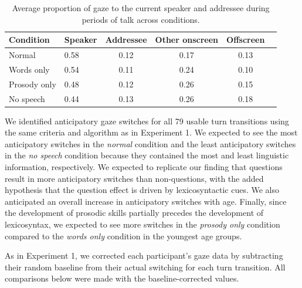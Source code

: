 \documentclass[authoryear, 12pt]{elsarticle}
\begin{document}
\begin{table}[t]
\begin{center}
  \begin{tabular}{llcccc}
    \hline
    Condition & Speaker & Addressee & Other onscreen & Offscreen\\ 
    \hline
    Normal & 0.58 & 0.12 & 0.17 & 0.13 \\ 
    Words only & 0.54 & 0.11 & 0.24 & 0.10 \\ 
    Prosody only & 0.48 & 0.12 & 0.26 & 0.15 \\ 
    No speech & 0.44 & 0.13 & 0.26 & 0.18 \\
    \hline
  \end{tabular}
\end{center}
  \caption{Average proportion of gaze to the current speaker and addressee during periods of talk across conditions.}
\label{tab:look_e2b}
\end{table}


We identified anticipatory gaze switches for all 79 usable turn transitions using the same criteria and algorithm as in Experiment 1. We expected to see the most anticipatory switches in the \textit{normal} condition and the least anticipatory switches in the \textit{no speech} condition because they contained the most and least linguistic information, respectively. We expected to replicate our finding that questions result in more anticipatory switches than non-questions, with the added hypothesis that the question effect is driven by lexicosyntactic cues. We also anticipated an overall increase in anticipatory switches with age. Finally, since the development of prosodic skills partially precedes the development of lexicosyntax, we expected to see more switches in the \textit{prosody only} condition compared to the \textit{words only} condition in the youngest age groups.

As in Experiment 1, we corrected each participant's gaze data by subtracting their random baseline from their actual switching for each turn transition. All comparisons below were made with the baseline-corrected values.
\end{document}
